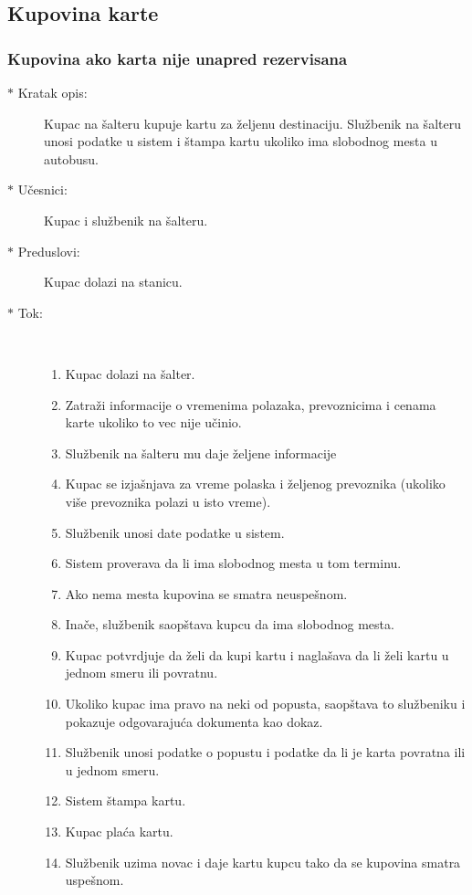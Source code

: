 \subsection{Kupovina karte}
\subsubsection{Kupovina ako karta nije unapred rezervisana}
\begin{description}
	\item[$\ast$ Kratak opis: ] Kupac na \v salteru kupuje kartu za \v zeljenu destinaciju. Slu\v zbenik na \v salteru unosi podatke u sistem i \v stampa kartu ukoliko ima slobodnog mesta u autobusu.
	\item[$\ast$ U\v cesnici: ] Kupac i slu\v zbenik na \v salteru.
	\item[$\ast$ Preduslovi: ] Kupac dolazi na stanicu.
	\item[$\ast$ Tok: ] \ \\
	\begin{enumerate}
		\item Kupac dolazi na \v salter.
		\item Zatra\v zi informacije o vremenima polazaka, prevoznicima i cenama karte ukoliko to vec nije u\v cinio.
		\item Slu\v zbenik na \v salteru mu daje \v zeljene informacije
		\item Kupac se izja\v snjava za vreme polaska i \v zeljenog prevoznika (ukoliko vi\v se prevoznika polazi u isto vreme).
		\item Slu\v zbenik unosi date podatke u sistem.
		\item Sistem proverava da li ima slobodnog mesta u tom terminu.
		\item Ako nema mesta kupovina se smatra neuspe\v snom.
		\item Ina\v ce, slu\v zbenik saop\v stava kupcu da ima slobodnog mesta.
		\item Kupac potvrdjuje da \v zeli da kupi kartu i nagla\v sava da li \v zeli kartu u jednom smeru ili povratnu.
		\item Ukoliko kupac ima pravo na neki od popusta, saop\v stava to slu\v zbeniku i pokazuje odgovaraju\'ca dokumenta kao dokaz.
		\item Slu\v zbenik unosi podatke o popustu i podatke da li je karta povratna ili u jednom smeru.
		\item Sistem \v stampa kartu.
		\item Kupac pla\' ca kartu.
		\item Slu\v zbenik uzima novac i daje kartu kupcu tako da se kupovina smatra uspe\v snom.
	\end{enumerate}
\end{description}


